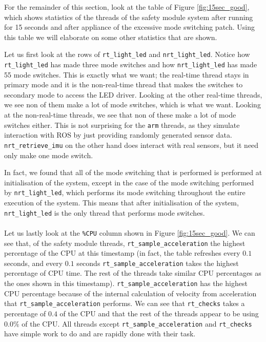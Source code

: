 \documentclass[12pt]{scrreprt}
\begin{document}
For the remainder of this section, look at the table of Figure \ref{fig:15sec_good}, which shows statistics of the threads of the safety module system after running for 15 seconds and after appliance of the excessive mode switching patch. Using this table we will elaborate on some other statistics that are shown.  
\par
Let us first look at the rows of \texttt{rt\_light\_led} and \texttt{nrt\_light\_led}. Notice how \texttt{rt\_light\_led} has made three mode switches and how \texttt{nrt\_light\_led} has made 55 mode switches. This is exactly what we want; the real-time thread stays in primary mode and it is the non-real-time thread that makes the switches to secondary mode to access the LED driver. Looking at the other real-time threads, we see non of them make a lot of mode switches, which is what we want. Looking at the non-real-time threads, we see that non of these make a lot of mode switches either. This is not surprising for the \texttt{arm} threads, as they simulate interaction with ROS by just providing randomly generated sensor data. \texttt{nrt\_retrieve\_imu} on the other hand does interact with real sensors, but it need only make one mode switch.
\par
In fact, we found that all of the mode switching that is performed is performed at initialisation of the system, except in the case of the mode switching performed by \texttt{nrt\_light\_led}, which performs its mode switching throughout the entire execution of the system. This means that after initialisation of the system, \texttt{nrt\_light\_led} is the only thread that performs mode switches.
\\\\
Let us lastly look at the \texttt{\%CPU} column shown in Figure \ref{fig:15sec_good}. We can see that, of the safety module threads, \texttt{rt\_sample\_acceleration} the highest percentage of the CPU at this timestamp (in fact, the table refreshes every $0.1$ seconds, and every $0.1$ seconds \texttt{rt\_sample\_acceleration} takes the highest percentage of CPU time. The rest of the threads take similar CPU percentages as the ones shown in this timestamp). \texttt{rt\_sample\_acceleration} has the highest CPU percentage  because of the internal calculation of velocity from acceleration that \texttt{rt\_sample\_acceleration} performs. We can see that \texttt{rt\_checks} takes a percentage of $0.4$ of the CPU and that the rest of the threads appear to be using $0.0\%$ of the CPU. All threads except \texttt{rt\_sample\_acceleration} and \texttt{rt\_checks} have simple work to do and are rapidly done with their task. 
\end{document}
